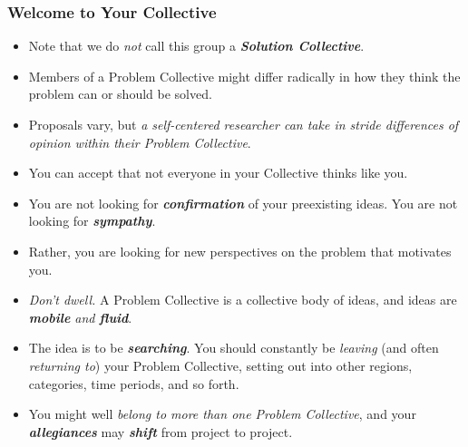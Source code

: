 \documentclass[11pt]{article}
\begin{document}
\subsubsection{Welcome to Your Collective}
\begin{itemize}
\item Note that we do \emph{not} call this group a \emph{\textbf{Solution Collective}}.

\item Members of a Problem Collective might differ radically in how they think the problem can or should be solved.

\item Proposals vary, but \emph{a self-centered researcher can take in stride differences of opinion within their Problem Collective}. 

\item You can accept that not everyone in your Collective thinks like you.

\item You are not looking for \emph{\textbf{confirmation}} of your preexisting ideas. You are not looking for \emph{\textbf{sympathy}}.

\item Rather, you are looking for new perspectives on the problem that motivates you. 

\item \emph{Don’t dwell.} A Problem Collective is a collective body of ideas, and ideas are \emph{\textbf{mobile} and \textbf{fluid}}. 

\item The idea is to be \emph{\textbf{searching}}. You should constantly be \emph{leaving} (and often \emph{returning to}) your Problem Collective, setting out into other regions, categories, time periods, and so forth. 

\item You might well \emph{belong to more than one Problem Collective}, and your \emph{\textbf{allegiances}} may \emph{\textbf{shift}} from project to project.
\end{itemize}
\end{document}
